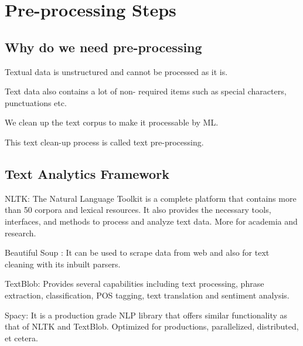 	\section{Pre-processing Steps}
	\subsection{Why do we need pre-processing}
	\begin{bulletedlist}
		\item Textual data is unstructured and cannot be processed as it is.
		\item Text data also contains a lot of non- required items such as special characters, punctuations etc.
		\item We clean up the text corpus to make it processable by ML.
		\item This text clean-up process is called text pre-processing.
	\end{bulletedlist}

	\subsection{Text Analytics Framework}
	\begin{bulletedlist}
		\item NLTK: The Natural Language Toolkit is a complete platform that contains more than 50 corpora and lexical resources. It also provides the necessary tools, interfaces, and methods to process and analyze text data.  More for academia and research.
		\item Beautiful Soup : It can be used to scrape data from web and also for text cleaning with its inbuilt parsers.
		\item TextBlob: Provides several capabilities including text processing, phrase extraction, classification, POS tagging, text translation and sentiment analysis.
		\item Spacy: It is a production grade NLP library that offers similar functionality as that of NLTK and TextBlob.  Optimized for productions, parallelized, distributed, et cetera.
	\end{bulletedlist}

